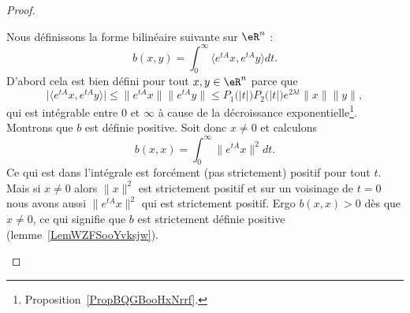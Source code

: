 \begin{proof}
\begin{subproof}
    Nous définissons la forme bilinéaire suivante sur \( \eR^n\) :
    \begin{equation}
        b(x,y)=\int_0^{\infty}\langle  e^{tA}x,  e^{tA}y\rangle dt.
    \end{equation}
    D'abord cela est bien défini pour tout \( x,y\in \eR^n\) parce que
    \begin{equation}
        \big| \langle  e^{tA}x,  e^{tA}y\rangle  \big|\leq \|  e^{tA}x \|\|  e^{tA}y \|\leq P_1\big( | t | \big)P_2\big( | t | \big) e^{2\lambda t}\| x \|\| y \|,
    \end{equation}
    qui est intégrable entre \( 0\) et \( \infty\) à cause de la décroissance exponentielle\footnote{Proposition~\ref{PropBQGBooHxNrrf}.}. Montrons que \( b\) est définie positive. Soit donc \( x\neq 0\) et calculons
    \begin{equation}
        b(x,x)=\int_0^{\infty}\|  e^{tA}x \|^2dt.
    \end{equation}
    Ce qui est dans l'intégrale est forcément (pas strictement) positif pour tout \( t\). Mais si \( x\neq 0\) alors \( \| x \|^2\) est strictement positif et sur un voisinage de \( t=0\) nous avons aussi \( \|  e^{tA}x \|^2\) qui est strictement positif. Ergo \( b(x,x)>0\) dès que \( x\neq 0\), ce qui signifie que \( b\) est strictement définie positive (lemme~\ref{LemWZFSooYvksjw}).


\end{subproof}
\end{proof}
